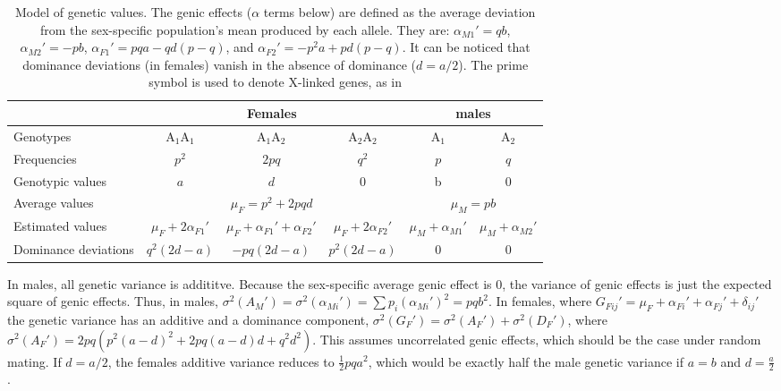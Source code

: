 \documentclass[a4paper,12pt]{article}
\begin{document}
\begin{table}
\begin{center}
\caption{Model of genetic values. The genic effects ($\alpha$ terms below) are defined as the average deviation from the sex-specific population's mean produced by each allele. They are: $\alpha_{M1}'=qb$, $\alpha_{M2}'=-pb$, $\alpha_{F1}'=pqa - qd(p-q)$, and $\alpha_{F2}'=-p^2a + pd(p-q)$. It can be noticed that dominance deviations (in females) vanish in the absence of dominance ($d=a/2$). The prime symbol is used to denote X-linked genes, as in \cite[chapter 24]{Lynch1998}}\label{tau:values}
\begin{tabular}{lccccc}
\toprule
&\multicolumn{3}{c}{Females}&\multicolumn{2}{c}{males}\\
\midrule
Genotypes&A$_1$A$_1$&A$_1$A$_2$&A$_2$A$_2$&A$_1$&A$_2$\\
Frequencies&$p^2$&$2pq$&$q^2$&$p$&$q$\\
Genotypic values&$a$&$d$&0&b&0\\
\cmidrule(lr){2-4}\cmidrule(lr){5-6}
Average values&\multicolumn{3}{c}{$\mu_F=p^2 + 2pqd$}&\multicolumn{2}{c}{$\mu_M=pb$}\\
\cmidrule(lr){2-4}\cmidrule(lr){5-6}
Estimated values&$\mu_F + 2\alpha_{F1}'$&$\mu_F + \alpha_{F1}' + \alpha_{F2}'$&$\mu_F + 2\alpha_{F2}'$&$\mu_M + \alpha_{M1}'$&$\mu_M + \alpha_{M2}'$\\
Dominance deviations&$q^2(2d - a)$&$-pq(2d-a)$&$p^2(2d-a)$&0&0\\
\bottomrule
\end{tabular}
\end{center}
\end{table}

In males, all genetic variance is addititve. Because the sex-specific average genic effect is 0, the variance of genic effects is just the expected square of genic effects. Thus, in males, $\sigma^2(A_M')=\sigma^2(\alpha_{Mi}')=\sum p_i(\alpha_{Mi}')^2=pqb^2$. In females, where $G_{Fij}'=\mu_F + \alpha_{Fi}' + \alpha_{Fj}' + \delta_{ij}'$ the genetic variance has an additive and a dominance component, $\sigma^2(G_F')=\sigma^2(A_F') + \sigma^2(D_F')$, where $\sigma^2(A_F')=2pq(p^2(a-d)^2 + 2pq(a-d)d + q^2d^2)$. This assumes uncorrelated genic effects, which should be the case under random mating. If $d = a/2$, the females additive variance reduces to $\frac{1}{2}pqa^2$, which would be exactly half the male genetic variance if $a = b$ and $d=\frac{a}{2}$. 
\end{document}
